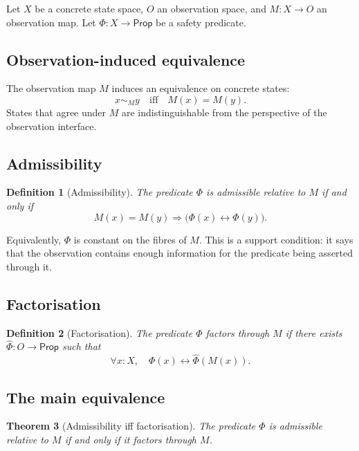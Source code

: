 \documentclass[a4paper,11pt]{article}
\newtheorem{theorem}{Theorem}[section]
\newtheorem{definition}[theorem]{Definition}
\begin{document}
Let \(X\) be a concrete state space, \(O\) an observation space, and
\(M : X \to O\) an observation map. Let \(\Phi : X \to \mathsf{Prop}\) be a
safety predicate.

\subsection{Observation-induced equivalence}

The observation map \(M\) induces an equivalence on concrete states:
\[
  x \sim_M y \quad\text{iff}\quad M(x) = M(y).
\]
States that agree under \(M\) are indistinguishable from the perspective of
the observation interface.

\subsection{Admissibility}

\begin{definition}[Admissibility]
\label{def:admissible}
The predicate \(\Phi\) is \emph{admissible} relative to \(M\) if and only if
\[
  M(x) = M(y) \Longrightarrow \bigl(\Phi(x) \leftrightarrow \Phi(y)\bigr).
\]
\end{definition}

Equivalently, \(\Phi\) is constant on the fibres of \(M\). This is a support
condition: it says that the observation contains enough information for the
predicate being asserted through it.

\subsection{Factorisation}

\begin{definition}[Factorisation]
\label{def:factorisation}
The predicate \(\Phi\) \emph{factors through} \(M\) if there exists
\(\widehat{\Phi} : O \to \mathsf{Prop}\) such that
\[
  \forall x : X,\quad \Phi(x) \leftrightarrow \widehat{\Phi}(M(x)).
\]
\end{definition}

\subsection{The main equivalence}

\begin{theorem}[Admissibility iff factorisation]
\label{thm:backbone}
The predicate \(\Phi\) is admissible relative to \(M\) if and only if it
factors through \(M\).
\end{theorem}
\end{document}
